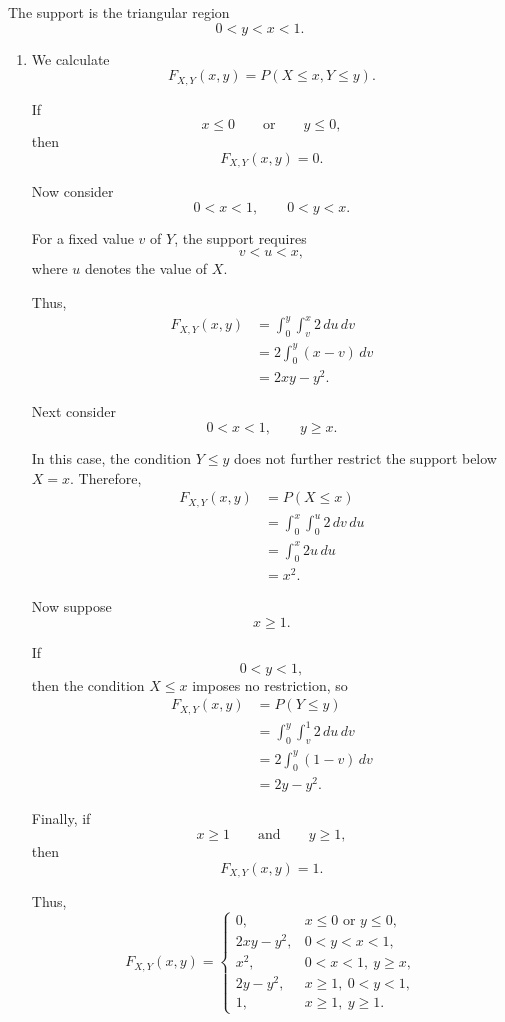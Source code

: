 \documentclass[11pt]{article}
\newenvironment{solution}{
    \par
    \begin{tcolorbox}[
        colback=white,
        colframe=uwgold,
        boxrule=0.7pt,
        arc=2mm,
        left=3mm,
        right=3mm,
        top=2mm,
        bottom=2mm,
        breakable,
        before skip=0.5em,
        after skip=1em,
        title=\textbf{Solution},
        coltitle=uwpurple,
        fonttitle=\bfseries
    ]
}{
    \end{tcolorbox}
}
\begin{document}
\begin{solution}

The support is the triangular region
\[
0<y<x<1.
\]

\begin{enumerate}[label=(\alph*)]

\item We calculate
\[
F_{X,Y}(x,y)
=
P(X\leq x,Y\leq y).
\]

If
\[
x\leq0
\qquad\text{or}\qquad
y\leq0,
\]
then
\[
F_{X,Y}(x,y)=0.
\]

Now consider
\[
0<x<1,
\qquad
0<y<x.
\]

For a fixed value \(v\) of \(Y\), the support requires
\[
v<u<x,
\]
where \(u\) denotes the value of \(X\).

Thus,
\[
\begin{aligned}
F_{X,Y}(x,y)
&=
\int_0^y
\int_v^x
2\,du\,dv\\
&=
2\int_0^y(x-v)\,dv\\
&=
2xy-y^2.
\end{aligned}
\]

Next consider
\[
0<x<1,
\qquad
y\geq x.
\]

In this case, the condition \(Y\leq y\) does not further restrict the support
below \(X=x\). Therefore,
\[
\begin{aligned}
F_{X,Y}(x,y)
&=
P(X\leq x)\\
&=
\int_0^x
\int_0^u
2\,dv\,du\\
&=
\int_0^x2u\,du\\
&=
x^2.
\end{aligned}
\]

Now suppose
\[
x\geq1.
\]

If
\[
0<y<1,
\]
then the condition \(X\leq x\) imposes no restriction, so
\[
\begin{aligned}
F_{X,Y}(x,y)
&=
P(Y\leq y)\\
&=
\int_0^y
\int_v^1
2\,du\,dv\\
&=
2\int_0^y(1-v)\,dv\\
&=
2y-y^2.
\end{aligned}
\]

Finally, if
\[
x\geq1
\qquad\text{and}\qquad
y\geq1,
\]
then
\[
F_{X,Y}(x,y)=1.
\]

Thus,
\[
F_{X,Y}(x,y)
=
\begin{cases}
0,
&
x\leq0\text{ or }y\leq0,\\[1mm]
2xy-y^2,
&
0<y<x<1,\\[1mm]
x^2,
&
0<x<1,\ y\geq x,\\[1mm]
2y-y^2,
&
x\geq1,\ 0<y<1,\\[1mm]
1,
&
x\geq1,\ y\geq1.
\end{cases}
\]


\end{enumerate}
\end{solution}
\end{document}
